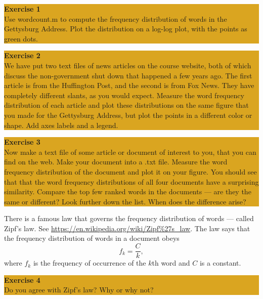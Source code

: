 \documentclass[12pt]{amsart}
\begin{document}
\bigskip
\begin{center}
\colorbox{Goldenrod}{\parbox{15cm}{
{
\textbf{\large Exercise 1}\vspace{1mm} \\
Use wordcount.m to compute the frequency distribution of words in the Gettysburg Address.  Plot the distribution on a log-log plot, with the points as green dots.
 }}}
\end{center}

\bigskip
\begin{center}
\colorbox{Goldenrod}{\parbox{15cm}{
{
\textbf{\large Exercise 2}\vspace{1mm} \\
We have put two text files of news articles on the course website, both of which discuss the non-government shut down that happened a few years ago.  The first article is from the Huffington Post, and the second is from Fox News.  They have completely different slants, as you would expect.  Measure the word frequency distribution of each article and plot these distributions on the same figure that you made for the Gettysburg Address, but plot the points in a different color or shape.  Add axes labels and a legend.
 }}}
\end{center}

\bigskip
\begin{center}
\colorbox{Goldenrod}{\parbox{15cm}{
{
\textbf{\large Exercise 3}\vspace{1mm} \\
Now make a text file of some article or document of interest to you, that you can find on the web.  Make your document into a .txt file.  Measure the word frequency distribution of the document and plot it on your figure.  You should see that that the word frequency distributions of all four documents have a surprising similarity.  Compare the top few ranked words in the documents --- are they the same or different?  Look further down the list.  When does the difference arise?
 }}}
\end{center}
\bigskip

\noindent There is a famous law that governs the frequency distribution of words --- called Zipf's law.  See \url{https://en.wikipedia.org/wiki/Zipf%27s_law}.  The law says that the frequency distribution of words in a document obeys
\[
f_k = \frac{C}{k},
\]
where $f_k$ is the frequency of occurrence of the $k$th word and $C$ is a constant.
\bigskip
\begin{center}
\colorbox{Goldenrod}{\parbox{15cm}{
{
\textbf{\large Exercise 4}\vspace{1mm} \\
Do you agree with Zipf's law?  Why or why not?}}}
\end{center}
\end{document}
